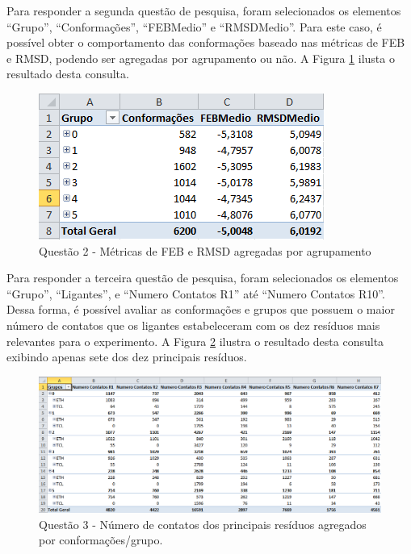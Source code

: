 Para responder a segunda questão de pesquisa, foram selecionados os elementos ``Grupo'', ``Conformações'', ``FEBMedio'' e ``RMSDMedio''. Para este caso, é possível obter o comportamento das conformações baseado nas métricas de FEB e RMSD, podendo ser agregadas por agrupamento ou não. A Figura \ref{fig:questao2} ilusta o resultado desta consulta.

\begin{figure}[h]
        \center
        \includegraphics[scale=0.8]{images/Questao2.PNG}
        \caption{Questão 2 - Métricas de FEB e RMSD agregadas por agrupamento}
        \label{fig:questao2}
\end{figure}

Para responder a terceira questão de pesquisa, foram selecionados os elementos ``Grupo'', ``Ligantes'', e ``Numero Contatos R1'' até ``Numero Contatos R10''. Dessa forma, é possível avaliar as conformações e grupos que possuem o maior número de contatos que os ligantes estabeleceram com os dez resíduos mais relevantes para o experimento. A Figura \ref{fig:questao3} ilustra o resultado desta consulta exibindo apenas sete dos dez principais resíduos.

\begin{figure}[h]
        \center
        \includegraphics[scale=0.58]{images/Questao3.PNG}
        \caption{Questão 3 - Número de contatos dos principais resíduos agregados por conformações/grupo.}
        \label{fig:questao3}
\end{figure}

